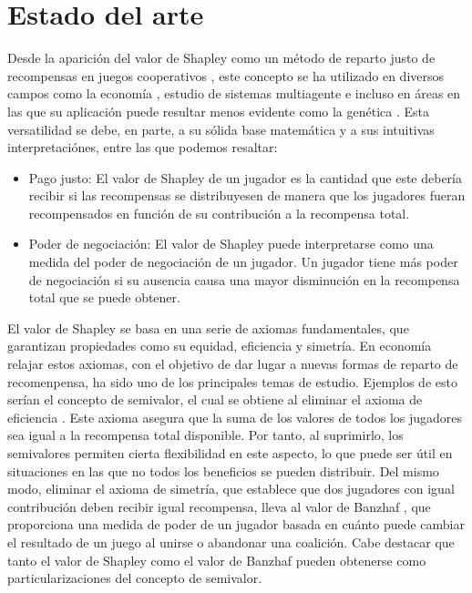\chapter{Estado del arte}
\justifying
Desde la aparición del valor de Shapley como un método de reparto
justo de recompensas en juegos cooperativos \cite{shapleyValue},
este concepto se ha utilizado en diversos campos como la
economía \cite{libroShapley}, estudio de sistemas multiagente
\cite{fatima} e incluso en áreas en las que su aplicación
puede resultar menos evidente como la genética
\cite{genes}. Esta versatilidad se debe, en parte, a su 
sólida base matemática y a sus intuitivas interpretaciónes,
entre las que podemos resaltar:

\begin{itemize}
  \item Pago justo: El valor de Shapley de un jugador es la cantidad
  que este debería recibir si las recompensas se distribuyesen de
  manera que los jugadores fueran recompensados en función de su
  contribución a la recompensa total.

  \item Poder de negociación: El valor de Shapley puede
  interpretarse como una medida del poder de negociación de un jugador.
  Un jugador tiene más poder de negociación si su ausencia causa
  una mayor disminución en la recompensa total que se puede obtener.
\end{itemize}

El valor de Shapley se basa en una serie de axiomas fundamentales,
que garantizan propiedades como su equidad, eficiencia y simetría.
En economía relajar estos axiomas, con el objetivo de dar lugar
a nuevas formas de reparto de recomenpensa, ha sido uno de
los principales temas de estudio. Ejemplos de esto serían el
concepto de semivalor, el cual se obtiene al eliminar el
axioma de eficiencia \cite{Dubey, Dubey2}.
Este axioma asegura que la suma de los valores de
todos los jugadores sea igual a la recompensa total disponible.
Por tanto, al suprimirlo, los semivalores permiten cierta
flexibilidad en este aspecto, lo que puede ser útil en
situaciones en las que no todos los beneficios se pueden distribuir.
Del mismo modo, eliminar el axioma de simetría, que
establece que dos jugadores con igual contribución deben recibir
igual recompensa, lleva al valor de Banzhaf \cite{banzhaf},
que proporciona una medida de poder de un jugador basada
en cuánto puede cambiar el resultado de un juego al unirse o
abandonar una coalición. Cabe destacar que tanto el valor de
Shapley como el valor de Banzhaf pueden obtenerse como
particularizaciones del concepto de semivalor.

